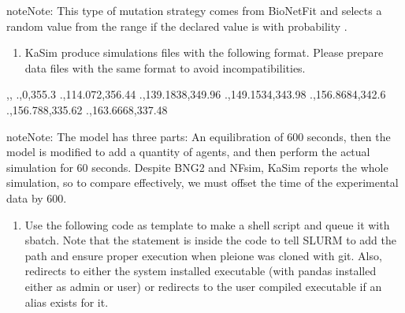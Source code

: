 \documentclass[letterpaper,10pt,english]{sphinxmanual}
\begin{document}
\begin{sphinxadmonition}{note}{Note:}
 This type of mutation strategy comes from BioNetFit and
selects a random value from the range 
if the declared value is  with probability .
\end{sphinxadmonition}
\begin{enumerate}
\def\theenumi{\arabic{enumi}}
\def\labelenumi{\theenumi .}
\makeatletter\def\p@enumii{\p@enumi \theenumi .}\makeatother
\setcounter{enumi}{1}
\item {} 

KaSim produce simulations files with the following format. Please prepare
data files with the same format to avoid incompatibilities.

\end{enumerate}

\begin{sphinxVerbatim}[commandchars=\\\{\}]
,,
.,0,355.3
.,114.072,356.44
.,139.1838,349.96
.,149.1534,343.98
.,156.8684,342.6
.,156.788,335.62
.,163.6668,337.48
\end{sphinxVerbatim}

\begin{sphinxadmonition}{note}{Note:}
 The model has three parts: An equilibration of
600 seconds, then the model is modified to add a quantity of  agents,
and then perform the actual simulation for 60 seconds. Despite BNG2 and NFsim,
KaSim reports the whole simulation, so to compare effectively, we must offset
the time of the experimental data by 600.
\end{sphinxadmonition}
\begin{enumerate}
\def\theenumi{\arabic{enumi}}
\def\labelenumi{\theenumi .}
\makeatletter\def\p@enumii{\p@enumi \theenumi .}\makeatother
\setcounter{enumi}{1}
\item {} 

Use the following code as template to make a shell script and queue it with
sbatch. Note that the  statement is inside the code to tell SLURM
to add the path and ensure proper execution when pleione was cloned with
git. Also,  redirects to either the system installed executable
(with pandas installed either as admin or user) or redirects to the user
compiled executable if an alias exists for it.

\end{enumerate}
\end{document}
